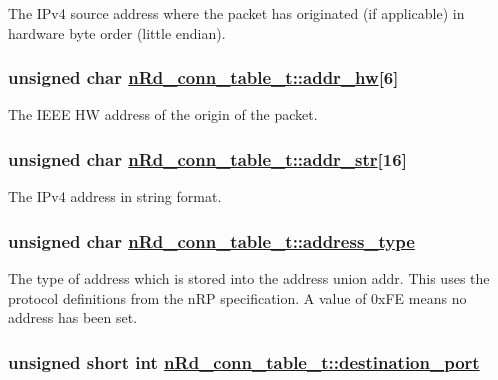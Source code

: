 The IPv4 source address where the packet has originated (if applicable) in hardware byte order (little endian). \hypertarget{structnRd__conn__table__t_ff09c033c2910e672f3f89c6110a8695}{
\subsubsection[addr\_\-hw]{\setlength{\rightskip}{0pt plus 5cm}unsigned char \hyperlink{structnRd__conn__table__t_ff09c033c2910e672f3f89c6110a8695}{n\-Rd\_\-conn\_\-table\_\-t::addr\_\-hw}\mbox{[}6\mbox{]}}}
\label{structnRd__conn__table__t_ff09c033c2910e672f3f89c6110a8695}


The IEEE HW address of the origin of the packet. \hypertarget{structnRd__conn__table__t_581a82e1027a1ab6f1c4f81afdc5168b}{
\subsubsection[addr\_\-str]{\setlength{\rightskip}{0pt plus 5cm}unsigned char \hyperlink{structnRd__conn__table__t_581a82e1027a1ab6f1c4f81afdc5168b}{n\-Rd\_\-conn\_\-table\_\-t::addr\_\-str}\mbox{[}16\mbox{]}}}
\label{structnRd__conn__table__t_581a82e1027a1ab6f1c4f81afdc5168b}


The IPv4 address in string format. \hypertarget{structnRd__conn__table__t_f6751f67d1c85517fe6f930da3479fec}{
\subsubsection[address\_\-type]{\setlength{\rightskip}{0pt plus 5cm}unsigned char \hyperlink{structnRd__conn__table__t_f6751f67d1c85517fe6f930da3479fec}{n\-Rd\_\-conn\_\-table\_\-t::address\_\-type}}}
\label{structnRd__conn__table__t_f6751f67d1c85517fe6f930da3479fec}


The type of address which is stored into the address union addr. This uses the protocol definitions from the n\-RP specification. A value of 0x\-FE means no address has been set. \hypertarget{structnRd__conn__table__t_c53b007ada85589b07305a287e3173cd}{
\subsubsection[destination\_\-port]{\setlength{\rightskip}{0pt plus 5cm}unsigned short int \hyperlink{structnRd__conn__table__t_c53b007ada85589b07305a287e3173cd}{n\-Rd\_\-conn\_\-table\_\-t::destination\_\-port}}}
\label{structnRd__conn__table__t_c53b007ada85589b07305a287e3173cd}


